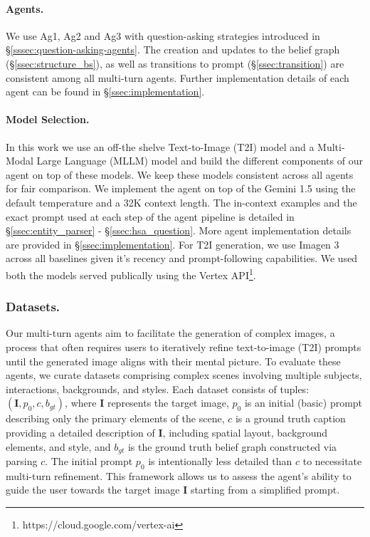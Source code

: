 \paragraph{Agents.\;} We use Ag1, Ag2 and Ag3 with question-asking strategies introduced in \S\ref{sssec:question-asking-agents}. 
The creation and updates to the belief graph (\S\ref{ssec:structure_bs}), as well as transitions to prompt (\S\ref{ssec:transition}) are consistent among all multi-turn agents. %
Further implementation details of each agent can be found in
\S\ref{ssec:implementation}.

\vspace{-1em}
\paragraph{Model Selection.}  In this work we use an off-the shelve Text-to-Image (T2I) model and a Multi-Modal Large Language (MLLM) model and build the different components of our agent on top of these models. We keep these models consistent across all agents for fair comparison. We implement the agent on top of the Gemini 1.5 \citep{geminiteam2024gemini15unlockingmultimodal} using the default temperature and a 32K context length. The in-context examples and the exact prompt used at each step of the agent pipeline is detailed in  \S \ref{ssec:entity_parser} - \S \ref{ssec:hsa_question}. More agent implementation details are provided in \S \ref{ssec:implementation}. For T2I generation, we use Imagen 3 \citep{imagenteamgoogle2024imagen3} across all baselines given it's recency and prompt-following capabilities. We used both the models served publically using the Vertex API\footnote{https://cloud.google.com/vertex-ai}. 


\subsubsection{Datasets.} Our multi-turn agents aim to facilitate the generation of complex images, a process that often requires users to iteratively refine text-to-image (T2I) prompts until the generated image aligns with their mental picture.  To evaluate these agents, we curate datasets comprising complex scenes involving multiple subjects, interactions, backgrounds, and styles. Each dataset consists of tuples: $(\mathbf{I}, p_0, c, b_{gt})$, where $\mathbf{I}$ represents the target image, $p_0$ is an initial (basic) prompt describing only the primary elements of the scene, $c$ is a ground truth caption providing a detailed description of $\mathbf{I}$, including spatial layout, background elements, and style, and $b_{gt}$ is the ground truth belief graph constructed via parsing $c$.  The initial prompt $p_0$ is intentionally less detailed than $c$ to necessitate multi-turn refinement. This framework allows us to assess the agent's ability to guide the user towards the target image $\mathbf{I}$ starting from a simplified prompt.

